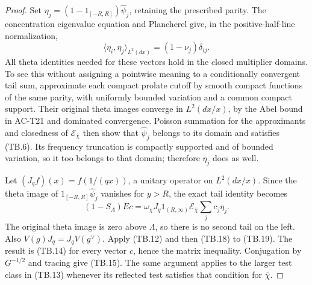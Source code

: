 \begin{proof}
Set \(\eta_j=(1-1_{[-R,R]})\widehat\psi_j\), retaining
the prescribed parity.  The concentration eigenvalue
equation and Plancherel give, in the positive-half-line
normalization,
\[
 \langle\eta_i,\eta_j\rangle_{L^2(dx)}
                  =(1-\nu_j)\delta_{ij}.
 \tag{TB.18}
\]
All theta identities needed for these vectors hold in the
closed multiplier domains.  To see this without assigning
a pointwise meaning to a conditionally convergent tail sum,
approximate each compact prolate cutoff by smooth compact
functions of the same parity, with uniformly bounded
variation and a common compact support.  Their original
theta images converge in \(L^2(dx/x)\), by the Abel bound
in AC-T21 and dominated convergence.  Poisson summation for
the approximants and closedness of
\(\mathcal E_{\overline\chi}\) then show that
\(\widehat\psi_j\) belongs to its domain and satisfies
(TB.6).  Its frequency truncation is compactly supported
and of bounded variation, so it too belongs to that domain;
therefore \(\eta_j\) does as well.

Let \((J_qf)(x)=f(1/(qx))\), a unitary operator on
\(L^2(dx/x)\).  Since the theta image of
\(1_{[-R,R]}\widehat\psi_j\) vanishes for \(y>R\),
the exact tail identity becomes
\[
 (1-S_\Lambda)Ec
    =\omega_\chi J_q1_{(R,\infty)}
                  \mathcal E_{\overline\chi}\sum_jc_j\eta_j.
 \tag{TB.19}
\]
The original theta image is zero above \(\Lambda\), so
there is no second tail on the left.  Also
\(V(g)J_q=J_qV(g^\vee)\).
Apply (TB.12) and then (TB.18) to (TB.19).
The result is (TB.14) for every vector \(c\), hence the
matrix inequality.  Conjugation by \(G^{-1/2}\) and tracing
give (TB.15).  The same argument applies to the larger
test class in (TB.13) whenever its reflected test satisfies
that condition for \(\overline\chi\).
\end{proof}

